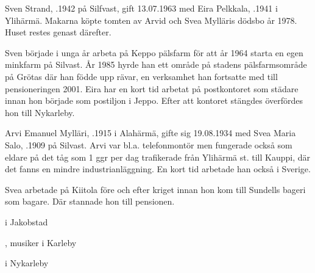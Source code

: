 


Sven Strand, .1942 på Silfvast, gift 13.07.1963 med Eira Pelkkala, .1941 i Ylihärmä. Makarna köpte tomten av Arvid och Svea Mylläris dödsbo år 1978. Huset restes genast därefter.

Sven började i unga år arbeta på Keppo pälsfarm för att år 1964 starta en egen minkfarm på Silvast. År 1985 hyrde han ett område på stadens pälsfarmsområde på Grötas där han födde upp rävar, en verksamhet han fortsatte med till pensioneringen 2001. Eira har en kort tid arbetat på postkontoret som städare innan hon började som postiljon i Jeppo. Efter att kontoret stängdes överfördes hon till Nykarleby.
\begin{jhchildren}
  \item {}
  \item {}
\end{jhchildren}





Arvi Emanuel Mylläri, .1915 i Alahärmä, gifte sig 19.08.1934 med Svea Maria Salo, .1909 på Silvast. Arvi var bl.a. telefonmontör men fungerade också som eldare på det tåg som 1 ggr per dag trafikerade från Ylihärmä st. till Kauppi, där det fanns en mindre industrianläggning. En kort tid arbetade han också i Sverige.

Svea arbetade på Kiitola före och efter kriget innan hon kom till Sundells bageri som bagare. Där stannade hon till pensionen.
\begin{jhchildren}
  \item {} i Jakobstad
  \item {}, musiker i Karleby
  \item {} i Nykarleby
\end{jhchildren}


